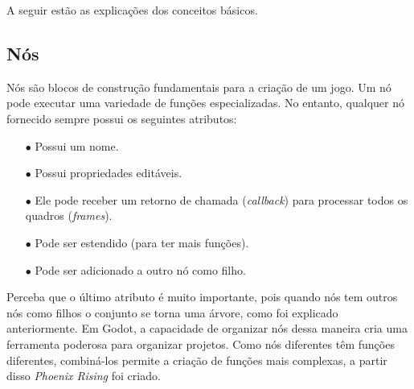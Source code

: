 A seguir estão as explicações dos conceitos básicos.

\subsection{Nós}

Nós são blocos de construção fundamentais para a criação de um jogo. Um nó pode
executar uma variedade de funções especializadas.
No entanto, qualquer nó fornecido sempre possui os seguintes atributos:
\begin{itemize}
    \item[$\bullet$]
        Possui um nome.
    \item[$\bullet$]
        Possui propriedades editáveis.
    \item[$\bullet$]
        Ele pode receber um retorno de chamada (\textit{callback}) para 
        processar todos os quadros (\textit{frames}).
    \item[$\bullet$]
        Pode ser estendido (para ter mais funções).
    \item[$\bullet$]
        Pode ser adicionado a outro nó como filho.
\end{itemize}

Perceba que o último atributo é muito importante, pois quando nós tem outros nós
como filhos o conjunto se torna uma árvore, como foi explicado anteriormente.
Em Godot, a capacidade de organizar nós dessa maneira cria uma ferramenta 
poderosa para organizar projetos. Como nós diferentes têm funções diferentes, 
combiná-los permite a criação de funções mais complexas, a partir disso
\textit{Phoenix Rising} foi criado.

